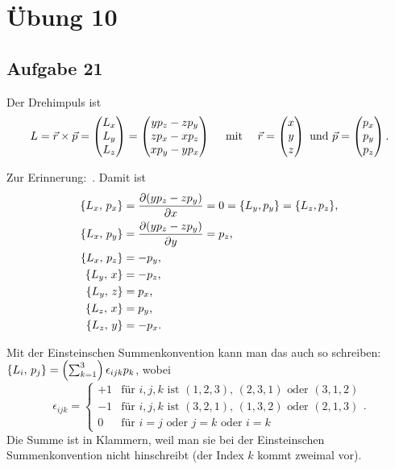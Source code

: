 \chapter*{Übung 10}

\section*{Aufgabe 21}

Der Drehimpuls ist 
\[
	L = \vec{r} \times \vec{p} = \begin{pmatrix} L_x \\ L_y \\ L_z \end{pmatrix} = \begin{pmatrix} 
		y p_z - z p_y \\
		z p_x - x p_z \\
		x p_y - y p_x
	 \end{pmatrix}
	\quad \text{ mit } \quad 
	\vec{r} = \begin{pmatrix} x \\ y \\ z \end{pmatrix} 
	\text{ und }
	\vec{p} = \begin{pmatrix} p_x \\ p_y \\ p_z \end{pmatrix}
	\text{.}
\]

Zur Erinnerung: \,. Damit ist
\begin{align*}
	\{ L_x, \, p_x \} &= \frac{\partial (y p_z - z p_y)}{\partial x} = 0 = \{ L_y, p_y \} = \{ L_z, p_z \} \text{,} \\
	\{ L_x, \, p_y \} &= \frac{\partial (y p_z - z p_y)}{\partial y} = p_z \text{,}	\\
	\{ L_x, \, p_z \} &= - p_y \text{,} \\
	\{ L_y, \, x \} &= - p_z \text{,} \\
	\{ L_y, \, z \} &= p_x \text{,} \\
	\{ L_z, \, x \} &= p_y \text{,} \\
	\{ L_z, \, y \} &= - p_x \text{.}
\end{align*}

Mit der Einsteinschen Summenkonvention kann man das auch so schreiben: $\{ L_i, \, p_j \} = \left( \sum^3_{k = 1} \right) \epsilon_{ijk} p_k$, wobei 
\[
	\epsilon_{ijk} = \left\{ 
	\begin{array}{cl} 
		+1 & \text{für $i, j, k$ ist $(1, 2, 3)$, $(2, 3, 1)$ oder $(3, 1, 2)$} \\
		-1 & \text{für $i, j, k$ ist $(3, 2, 1)$, $(1, 3, 2)$ oder $(2, 1, 3)$} \\
		0 & \text{für $i = j$ oder $j = k$ oder $i = k$}
	\end{array}
	\right.
	\text{.}
\]
Die Summe ist in Klammern, weil man sie bei der Einsteinschen Summenkonvention nicht hinschreibt (der Index $k$ kommt zweimal vor).

